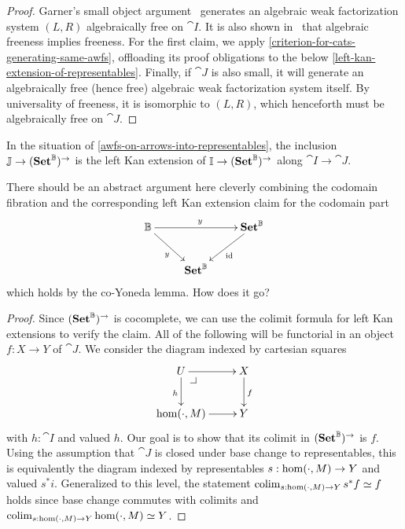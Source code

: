 \documentclass[reqno,10pt,a4paper,oneside]{amsart}
\begin{document}
\begin{proof}
Garner's small object argument~\cite{garner:small-object-argument} generates an algebraic weak factorization system $(L, R)$ algebraically free on $\cat{I}$. 
It is also shown in~\cite{garner:small-object-argument} that algebraic freeness implies freeness.
For the first claim, we apply \cref{criterion-for-cats-generating-same-awfs}, offloading its proof obligations to the below \cref{left-kan-extension-of-representables}.
Finally, if $\cat{J}$ is also small, it will generate an algebraically free (hence free) algebraic weak factorization system itself.
By universality of freeness, it is isomorphic to $(L, R)$, which henceforth must be algebraically free on $\cat{J}$.
\end{proof}

\begin{lemma}
\label{left-kan-extension-of-representables}
In the situation of \cref{awfs-on-arrows-into-representables}, the inclusion $\mathbb{J} \to (\mathbf{Set}^{\mathbb{B}})^{\to}$ is the left Kan extension of $\mathbb{I} \to (\mathbf{Set}^{\mathbb{B}})^{\to}$ along $\cat{I} \to \cat{J}$.
\end{lemma}

\begin{question}
There should be an abstract argument here cleverly combining the codomain fibration and the corresponding left Kan extension claim for the codomain part
\[
\xymatrix{
  \cat{B}
  \ar[rr]^{y}
  \ar[dr]_{y}
&&
  \Set^{\cat{B}}
  \ar[dl]^{\id}
\\&
  \Set^{\cat{B}}
}
\]
which holds by the co-Yoneda lemma.
How does it go?
\end{question}

\begin{proof}
Since $(\mathbf{Set}^{\mathbb{B}})^{\to}$ is cocomplete, we can use the colimit formula for left Kan extensions to verify the claim.
All of the following will be functorial in an object $f : X \to Y$ of $\cat{J}$.
We consider the diagram indexed by cartesian squares
\[
\xymatrix{
  U
  \ar[r]
  \ar[d]_{h}
  \pullback{dr}
&
  X
  \ar[d]^{f}
\\
  \hom(\arghole, M)
  \ar[r]
&
  Y
}
\]
with $h : \cat{I}$ and valued $h$.
Our goal is to show that its colimit in $(\mathbf{Set}^{\mathbb{B}})^{\to}$ is $f$.
Using the assumption that $\cat{J}$ is closed under base change to representables, this is equivalently the diagram indexed by representables $s : \hom(\mathop{\cdot}, M) \to Y$ and valued $s^* i$.
Generalized to this level, the statement $\operatorname{colim}_{s : \hom(\mathop{\cdot}, M) \to Y} s^* f \simeq f$ holds since base change commutes with colimits and $\operatorname{colim}_{s : \hom(\mathop{\cdot}, M) \to Y} \hom(\mathop{\cdot}, M) \simeq Y$.
\end{proof}
\end{document}
